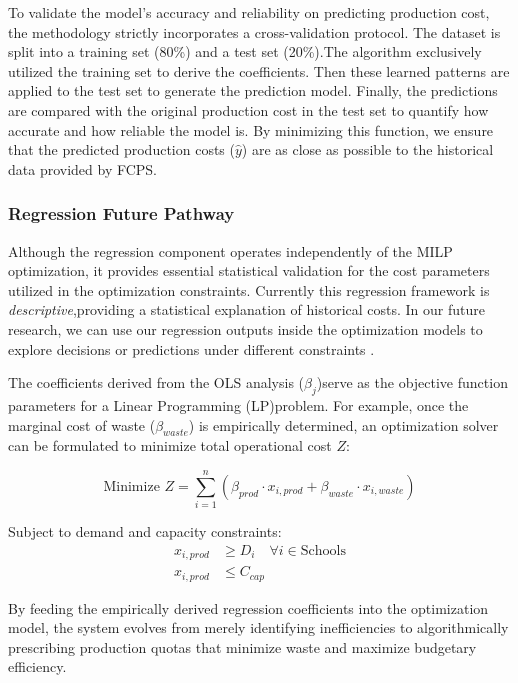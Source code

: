 \documentclass{scrartcl}
\begin{document}
To validate the model’s accuracy and reliability on predicting production cost, the methodology strictly incorporates a cross-validation protocol. The dataset is split into a training set (80\%) and a test set (20\%).The algorithm exclusively utilized the training set to derive the coefficients. Then these learned patterns are applied to the test set to generate the prediction model. Finally, the predictions are compared with the original production cost in the test set to quantify how accurate and how reliable the model is. By minimizing this function, we ensure that the predicted production costs ($\hat{y}$) are as close as possible to the historical data provided by FCPS.

\subsubsection{Regression Future Pathway}

Although the regression component operates independently of the MILP optimization, it provides essential statistical validation for the cost parameters utilized in the optimization constraints. Currently this regression framework is \textit{descriptive},providing a statistical explanation of historical costs. In our future research, we can use our regression outputs inside the optimization models to explore decisions or predictions under different constraints \cite{Elmachtoub2017}.

The coefficients derived from the OLS analysis ($\beta_j$)serve as the objective function parameters for a Linear Programming (LP)problem. For example, once the marginal cost of waste ($\beta_{waste}$) is empirically determined, an optimization solver can be formulated to minimize total operational cost $Z$:

\begin{equation}
    \text{Minimize } Z = \sum_{i=1}^{n} (\beta_{prod} \cdot x_{i,prod} + \beta_{waste} \cdot x_{i,waste})
\end{equation}


Subject to demand and capacity constraints:
\begin{align}
    x_{i,prod} &\geq D_{i} \quad \forall i \in \text{Schools} \\
    x_{i,prod} &\leq C_{cap}
\end{align}


By feeding the empirically derived regression coefficients into the optimization model, the system evolves from merely identifying inefficiencies to algorithmically prescribing production quotas that minimize waste and maximize budgetary efficiency.
\end{document}
